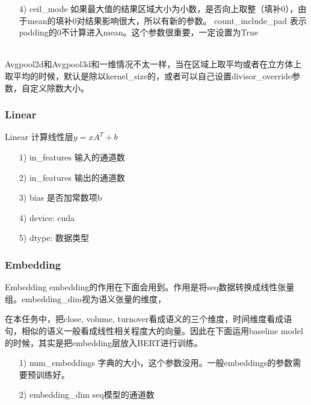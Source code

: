 \documentclass[11pt]{ctexart}
\begin{document}
\begin{itemize}
  \item [4)]
  ceil\_mode 如果最大值的结果区域大小为小数，是否向上取整（填补0），由于mean的填补0对结果影响很大，所以有新的参数。
  count\_include\_pad 表示padding的0不计算进入mean。这个参数很重要，一定设置为True

\end{itemize}

~\\
Avgpool2d和Avgpool3d和一维情况不太一样，当在区域上取平均或者在立方体上取平均的时候，默认是除以kernel\_size的，或者可以自己设置divisor\_override参数，自定义除数大小。

\subsubsection{Linear}
Linear
计算线性层$y = x A^T + b$
\begin{itemize}
  \item [1)]
  in\_features 输入的通道数
  \item [2)]
  in\_features 输出的通道数
  \item [3)]
  bias 是否加常数项b
  \item [4)]
  device: cuda
  \item [5)]
  dtype: 数据类型
\end{itemize}

\subsubsection{Embedding}
Embedding
embedding的作用在下面会用到。作用是将seq数据转换成线性张量组。embedding\_dim视为语义张量的维度，\par 在本任务中，把close, volume, turnover看成语义的三个维度，时间维度看成语句，相似的语义一般看成线性相关程度大的向量。因此在下面运用baseline model的时候，其实是把embedding层放入BERT进行训练。
\begin{itemize}
  \item [1)]
  num\_embeddings 字典的大小，这个参数没用。一般embeddings的参数需要预训练好。
  \item [2)]
  embedding\_dim seq模型的通道数

\end{itemize}
\end{document}
